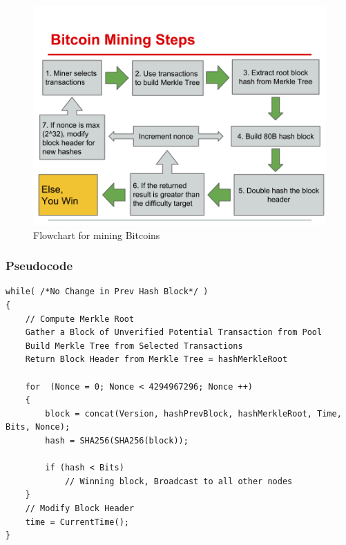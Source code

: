 \documentclass[pdftex,11pt]{article}
\begin{document}
\begin{figure}[H]
	\centering
	\includegraphics[width=150mm]{figures/steps.png}
	\caption{Flowchart for mining Bitcoins}
	\label{steps}
\end{figure}

\subsubsection{Pseudocode}
\begin{lstlisting}
while( /*No Change in Prev Hash Block*/ )
{
	// Compute Merkle Root
	Gather a Block of Unverified Potential Transaction from Pool
	Build Merkle Tree from Selected Transactions
	Return Block Header from Merkle Tree = hashMerkleRoot
	
	for  (Nonce = 0; Nonce < 4294967296; Nonce ++)
	{
		block = concat(Version, hashPrevBlock, hashMerkleRoot, Time, Bits, Nonce);
		hash = SHA256(SHA256(block));
		
		if (hash < Bits)
			// Winning block, Broadcast to all other nodes
	}
	// Modify Block Header
	time = CurrentTime();
}
\end{lstlisting}
\end{document}
